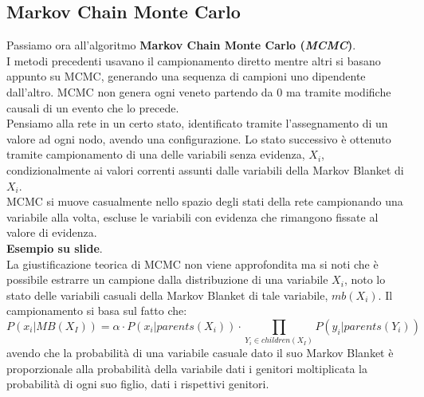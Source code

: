 \documentclass[a4paper,12pt, oneside]{book}
\begin{document}
\subsection{Markov Chain Monte Carlo}
Passiamo ora all'algoritmo \textbf{Markov Chain Monte Carlo (\textit{MCMC})}.\\
I metodi precedenti usavano il campionamento diretto mentre altri si basano
appunto su MCMC, generando una sequenza di campioni uno dipendente
dall'altro. MCMC non genera ogni veneto partendo da 0 ma tramite modifiche
causali di un evento che lo precede. \\
Pensiamo alla rete in un certo stato, identificato tramite l'assegnamento di un
valore ad ogni nodo, avendo una configurazione. Lo stato successivo è ottenuto
tramite campionamento di una delle variabili senza evidenza, $X_i$,
condizionalmente ai valori correnti assunti dalle variabili della Markov Blanket
di $X_i$.\\
MCMC si muove casualmente nello spazio degli stati della rete
campionando una variabile alla volta, escluse le variabili con evidenza che
rimangono fissate al valore di evidenza.\\
\textbf{Esempio su slide}.\\
La giustificazione teorica di MCMC non viene approfondita ma si noti che è
possibile estrarre un campione dalla distribuzione di una variabile $X_i$, noto
lo stato delle variabili casuali della Markov Blanket di tale variabile,
$mb(X_i)$. Il campionamento si basa sul fatto che:
\[P(x_i|MB(X_I))=\alpha\cdot P(x_i|parents(X_i))\cdot \prod_{Y_i\in
    children(X_I)}P(y_i|parents (Y_i))\]
avendo che la probabilità di una variabile casuale dato il suo Markov Blanket è
proporzionale alla probabilità della variabile dati i genitori moltiplicata la
probabilità di ogni suo figlio, dati i rispettivi genitori.
\end{document}
